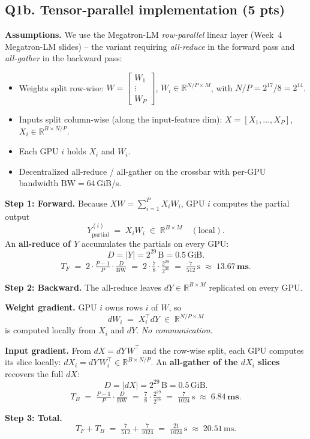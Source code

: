 \documentclass[11pt]{article}
\newcommand{\step}[1]{\noindent\textbf{#1}\quad}
\begin{document}
\subsection*{Q1b. Tensor-parallel implementation (5 pts)}

\begin{stepbox}
\step{Assumptions.}
We use the Megatron-LM \emph{row-parallel} linear layer
(Week~4 Megatron-LM slides) -- the variant requiring
\emph{all-reduce} in the forward pass and \emph{all-gather} in the backward pass:
\begin{itemize}[leftmargin=*, itemsep=1pt]
    \item Weights split row-wise:
        $W = \begin{bmatrix} W_1 \\ \vdots \\ W_P \end{bmatrix}$,
        $W_i \in \mathbb{R}^{N/P \times M}$, with $N/P = 2^{17}/8 = 2^{14}$.
    \item Inputs split column-wise (along the input-feature dim):
        $X = [X_1, \ldots, X_P]$, $X_i \in \mathbb{R}^{B \times N/P}$.
    \item Each GPU $i$ holds $X_i$ and $W_i$.
    \item Decentralized all-reduce / all-gather on the crossbar
        with per-GPU bandwidth $\mathrm{BW} = 64\,$GiB/s.
\end{itemize}

\medskip
\step{Step 1: Forward.}
Because $X W = \sum_{i=1}^{P} X_i W_i$, GPU $i$ computes the partial output
\[
    Y^{(i)}_{\text{partial}} \;=\; X_i W_i \;\in\; \mathbb{R}^{B\times M}
    \quad(\text{local}).
\]
An \textbf{all-reduce of $Y$} accumulates the partials on every GPU:
\[
    D = |Y| = 2^{29}\,\text{B} = 0.5\,\text{GiB}.
\]
\[
    T_{F} \;=\; 2\cdot\tfrac{P-1}{P}\cdot\tfrac{D}{\mathrm{BW}}
        \;=\; 2\cdot\tfrac{7}{8}\cdot\tfrac{2^{29}}{2^{36}}
        \;=\; \tfrac{7}{512}\,\text{s}
        \;\approx\; \mathbf{13.67\,\text{ms}}.
\]

\medskip
\step{Step 2: Backward.}
The all-reduce leaves $dY \in \mathbb{R}^{B\times M}$ replicated on every GPU.

\textbf{Weight gradient.} GPU $i$ owns rows $i$ of $W$, so
\[
    dW_i \;=\; X_i^{\top} dY \;\in\;\mathbb{R}^{N/P\times M}
\]
is computed locally from $X_i$ and $dY$. \emph{No communication.}

\textbf{Input gradient.} From $dX = dY\,W^{\top}$ and the row-wise split,
each GPU computes its slice locally:
$dX_i = dY\, W_i^{\top} \in \mathbb{R}^{B\times N/P}$.
An \textbf{all-gather of the $dX_i$ slices} recovers the full $dX$:
\[
    D = |dX| = 2^{29}\,\text{B} = 0.5\,\text{GiB}.
\]
\[
    T_{B} \;=\; \tfrac{P-1}{P}\cdot\tfrac{D}{\mathrm{BW}}
        \;=\; \tfrac{7}{8}\cdot\tfrac{2^{29}}{2^{36}}
        \;=\; \tfrac{7}{1024}\,\text{s}
        \;\approx\; \mathbf{6.84\,\text{ms}}.
\]

\medskip
\step{Step 3: Total.}
\[
    T_{F} + T_{B} \;=\;\tfrac{7}{512} + \tfrac{7}{1024}
        \;=\; \tfrac{21}{1024}\,\text{s}
        \;\approx\; \boxed{20.51\,\text{ms}}.
\]
\end{stepbox}
\end{document}

